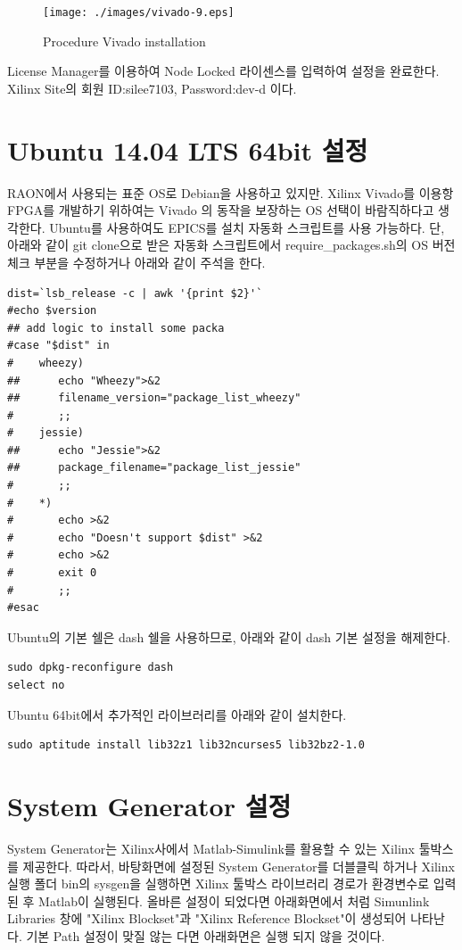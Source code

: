 \documentclass[11pt
  , a4paper
  , article
  , oneside
]{memoir}
\begin{document}
\begin{figure}[h!]
	\centering
	\texttt{[image: ./images/vivado-9.eps]}
	\caption{Procedure Vivado installation}
	\label{fig:viva_install_9} 
\end{figure}

\clearpage

License Manager를 이용하여 Node Locked 라이센스를 입력하여 설정을 완료한다. Xilinx Site의 회원 ID:silee7103, Password:dev-d 이다.

\chapter{Ubuntu 14.04 LTS 64bit 설정}
RAON에서 사용되는 표준 OS로 Debian을 사용하고 있지만. Xilinx Vivado를 이용항 FPGA를 개발하기 위하여는 Vivado 의 동작을 보장하는 OS 선택이 바람직하다고 생각한다. Ubuntu를 사용하여도 EPICS를 설치 자동화 스크립트를 사용 가능하다.
단, 아래와 같이 git clone으로 받은 자동화 스크립트에서 require\_packages.sh의 OS 버전체크 부분을 수정하거나 아래와 같이 주석을 한다.


\begin{lstlisting}[style=termstyle]
dist=`lsb_release -c | awk '{print $2}'`
#echo $version
## add logic to install some packa
#case "$dist" in
#    wheezy)
##      echo "Wheezy">&2
##      filename_version="package_list_wheezy"
#       ;;
#    jessie)
##      echo "Jessie">&2
##      package_filename="package_list_jessie"
#       ;;
#    *)
#       echo >&2
#       echo "Doesn't support $dist" >&2
#       echo >&2
#       exit 0
#       ;;
#esac
\end{lstlisting}

Ubuntu의 기본 쉘은 dash 쉘을 사용하므로, 아래와 같이 dash 기본 설정을 해제한다.
\begin{lstlisting}[style=termstyle]
sudo dpkg-reconfigure dash
select no
\end{lstlisting}

Ubuntu 64bit에서 추가적인 라이브러리를 아래와 같이 설치한다.
\begin{lstlisting}[style=termstyle]
sudo aptitude install lib32z1 lib32ncurses5 lib32bz2-1.0
\end{lstlisting}


\chapter{System Generator 설정}
System Generator는 Xilinx사에서 Matlab-Simulink를 활용할 수 있는 Xilinx 툴박스를 제공한다. 따라서, 바탕화면에 설정된 System Generator를 더블클릭 하거나 Xilinx 실행 폴더 bin의 sysgen을 실행하면 Xilinx 툴박스 라이브러리 경로가 환경변수로 입력된 후 Matlab이 실행된다. 올바른 설정이 되었다면 아래화면에서 처럼 Simunlink Libraries 창에 "Xilinx Blockset"과 "Xilinx Reference Blockset"이 생성되어 나타난다. 기본 Path 설정이 맞질 않는 다면 아래화면은 실행 되지 않을 것이다.
\end{document}
